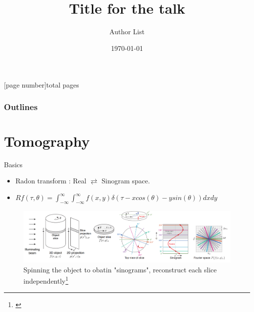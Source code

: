 \documentclass{beamer}
\title[LANS Seminar]
{Title for the talk}
\author[Speaker]{Author List}
\subtitle{}
\institute[ANL/MCS]{Argonne National Laboratory}
\date{\today}
\begin{document}
{
\frame{\titlepage}
}

[page number]{total pages}

\begin{frame}
  \frametitle{Outlines}
  \tableofcontents
\end{frame}

\section{Tomography}
\begin{frame}{Basics}
	\begin{block}{}
		\begin{itemize}
			\item Radon transform : Real $\rightleftarrows$ Sinogram space.
			\item $Rf(\tau,\theta) = 
			\int_{-\infty}^{\infty}\int_{-\infty}^{\infty}
			f(x,y)\delta(\tau - x cos(\theta) - y sin(\theta))dxdy $
		\end{itemize}
	\end{block}
	\begin{center}
		\begin{figure}
			\includegraphics[scale=0.335]{figures/ppa_combined.png}
			\caption{Spinning the object to obatin "sinograms", reconstruct each slice independently\footnote{\cite{jacobsen_2019}}}
		\end{figure}
	\end{center}
	
\end{frame}
\end{document}
